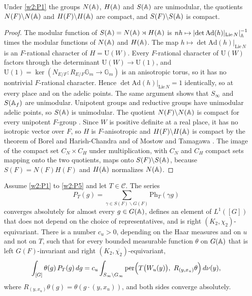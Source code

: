 \begin{lemma}\label{w2:unimod}
Under \ref{w2:P1} the groups $N(\mathbb A)$, $H(\mathbb A)$ and $S(\mathbb A)$ are unimodular, the quotients $N(F)\backslash N(\mathbb A)$ and $H(F)\backslash H(\mathbb A)$ are compact, and $S(F)\backslash S(\mathbb A)$ is compact.
\end{lemma}

\begin{proof}
The modular function of $S(\mathbb A)=N(\mathbb A)\rtimes H(\mathbb A)$ is $nh\mapsto\lvert\det\mathrm{Ad}(h)|_{\mathrm{Lie}\,N}\rvert_\mathbb A^{-1}$ times the modular functions of $N(\mathbb A)$ and $H(\mathbb A)$. The map $h\mapsto\det\mathrm{Ad}(h)|_{\mathrm{Lie}\,N}$ is an $F$-rational character of $H=\mathrm U(W)$. Every $F$-rational character of $\mathrm U(W)$ factors through the determinant $\mathrm U(W)\to\mathrm U(1)$, and $\mathrm U(1)=\ker(N_{E/F}\colon R_{E/F}\mathbb G_m\to\mathbb G_m)$ is an anisotropic torus, so it has no nontrivial $F$-rational character. Hence $\det\mathrm{Ad}(h)|_{\mathrm{Lie}\,N}=1$ identically, so at every place and on the adelic points. The same argument shows that $S_\infty$ and $S(\mathbb A_f)$ are unimodular. Unipotent groups and reductive groups have unimodular adelic points, so $S(\mathbb A)$ is unimodular. The quotient $N(F)\backslash N(\mathbb A)$ is compact for every unipotent $F$-group \cite{w2borel}. Since $W$ is positive definite at a real place, it has no isotropic vector over $F$, so $H$ is $F$-anisotropic and $H(F)\backslash H(\mathbb A)$ is compact by the theorem of Borel and Harish-Chandra and of Mostow and Tamagawa \cite{w2bhc}. The image of the compact set $C_N\times C_H$ under multiplication, with $C_N$ and $C_H$ compact sets mapping onto the two quotients, maps onto $S(F)\backslash S(\mathbb A)$, because $S(F)=N(F)H(F)$ and $H(\mathbb A)$ normalizes $N(\mathbb A)$.
\end{proof}

\begin{proposition}[unfolding]\label{w2:unfold}
Assume \ref{w2:P1} to \ref{w2:P5} and let $T\in\mathcal C$. The series
\[
P_T(g)=\sum_{\gamma\in S(F)\backslash G(F)}\mathrm{Ph}_T(\gamma g)
\]
converges absolutely for almost every $g\in G(\mathbb A)$, defines an element of $L^1([G])$ that does not depend on the choice of representatives, and is right $(K_2,\chi_2)$-equivariant. There is a number $c_u>0$, depending on the Haar measures and on $u$ and not on $T$, such that for every bounded measurable function $\theta$ on $G(\mathbb A)$ that is left $G(F)$-invariant and right $(K_2,\overline{\chi_2})$-equivariant,
\begin{equation}\label{w2:perlaw}
\int_{[G]}\theta(g)\,P_T(g)\,dg=c_u\int_{S_\infty\backslash G_\infty}\per\Bigl(T\bigl(W_u(y)\bigr),\ R_{(y,x_u)}\theta\Bigr)\,d\nu(y),
\end{equation}
where $R_{(y,x_u)}\theta(g)=\theta(g\cdot(y,x_u))$, and both sides converge absolutely.
\end{proposition}

